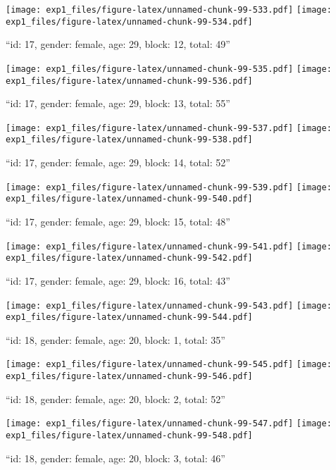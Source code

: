 \documentclass[,]{article}
\begin{document}
\texttt{[image: exp1\_files/figure-latex/unnamed-chunk-99-533.pdf]}
\texttt{[image: exp1\_files/figure-latex/unnamed-chunk-99-534.pdf]}

\newpage
[1] 

``id: 17, gender: female, age: 29, block: 12, total: 49''

\texttt{[image: exp1\_files/figure-latex/unnamed-chunk-99-535.pdf]}
\texttt{[image: exp1\_files/figure-latex/unnamed-chunk-99-536.pdf]}

\newpage
[1] 

``id: 17, gender: female, age: 29, block: 13, total: 55''

\texttt{[image: exp1\_files/figure-latex/unnamed-chunk-99-537.pdf]}
\texttt{[image: exp1\_files/figure-latex/unnamed-chunk-99-538.pdf]}

\newpage
[1] 

``id: 17, gender: female, age: 29, block: 14, total: 52''

\texttt{[image: exp1\_files/figure-latex/unnamed-chunk-99-539.pdf]}
\texttt{[image: exp1\_files/figure-latex/unnamed-chunk-99-540.pdf]}

\newpage
[1] 

``id: 17, gender: female, age: 29, block: 15, total: 48''

\texttt{[image: exp1\_files/figure-latex/unnamed-chunk-99-541.pdf]}
\texttt{[image: exp1\_files/figure-latex/unnamed-chunk-99-542.pdf]}

\newpage
[1] 

``id: 17, gender: female, age: 29, block: 16, total: 43''

\texttt{[image: exp1\_files/figure-latex/unnamed-chunk-99-543.pdf]}
\texttt{[image: exp1\_files/figure-latex/unnamed-chunk-99-544.pdf]}

\newpage
[1] 

``id: 18, gender: female, age: 20, block: 1, total: 35''

\texttt{[image: exp1\_files/figure-latex/unnamed-chunk-99-545.pdf]}
\texttt{[image: exp1\_files/figure-latex/unnamed-chunk-99-546.pdf]}

\newpage
[1] 

``id: 18, gender: female, age: 20, block: 2, total: 52''

\texttt{[image: exp1\_files/figure-latex/unnamed-chunk-99-547.pdf]}
\texttt{[image: exp1\_files/figure-latex/unnamed-chunk-99-548.pdf]}

\newpage
[1] 

``id: 18, gender: female, age: 20, block: 3, total: 46''
\end{document}
